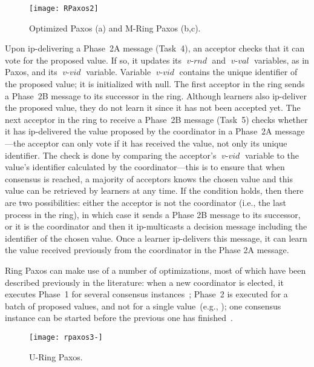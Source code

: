 \documentclass[final,3p,times,twocolumn,authoryear]{elsarticle}
\newcommand{\mv}[1]{\ensuremath{\operatorname{\mathit{#1}}}}
\begin{document}
\begin{figure*}[hbt]
\texttt{[image: RPaxos2]}
	\vspace{-5mm}\caption{Optimized Paxos (a) and M-Ring Paxos (b,c).}
	\label{fig:archh1}
\end{figure*}

Upon ip-delivering a Phase~2A message (Task~4), an acceptor checks that it can vote for the proposed value. If so, it updates its \mv{v-rnd} and \mv{v-val} variables, as in Paxos, and its \mv{v-vid} variable. Variable \mv{v-vid} contains the unique identifier of the proposed value; it is initialized with null. The first acceptor in the ring sends a Phase~2B message to its successor in the ring. Although learners also ip-deliver the proposed value, they do not learn it since it has not been accepted yet. The next acceptor in the ring to receive a Phase~2B message (Task~5) checks whether it has ip-delivered the value proposed by the coordinator in a Phase~2A message---the acceptor can only vote if it has received the value, not only its unique identifier. The check is done by comparing the acceptor's \mv{v-vid} variable to the value's identifier calculated by the coordinator---this is to ensure that when consensus is reached, a majority of acceptors knows the chosen value and this value can be retrieved by learners at any time. If the condition holds, then there are two possibilities: either the acceptor is not the coordinator (i.e., the last process in the ring), in which case it sends a Phase 2B message to its successor, or it is the coordinator and then it ip-multicasts a decision message including the identifier of the chosen value. Once a learner ip-delivers this message, it can learn the value received previously from the coordinator in the Phase 2A message.

Ring Paxos can make use of a number of optimizations, most of which have been described previously in the literature: when a new coordinator is elected, it executes Phase~1 for several consensus instances~\cite{Lam98}; Phase~2 is executed for a batch of proposed values, and not for a single value~(e.g., \cite{KA08}); one consensus instance can be started before the previous one has finished~\cite{Lam98}.

\begin{figure*}
  \begin{center}
	\texttt{[image: rpaxos3-]}
	\vspace{-8mm}\caption{U-Ring Paxos.}
\label{fig:arch2}
  \end{center}
\end{figure*}
\end{document}
